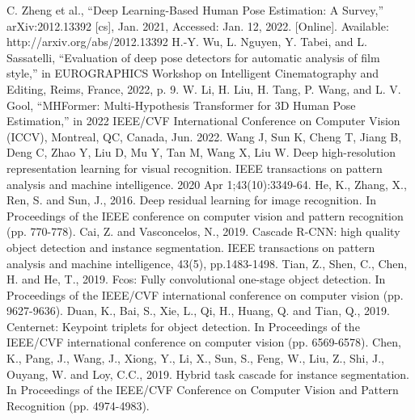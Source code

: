 \documentclass[runningheads]{llncs}
\begin{document}

\begin{thebibliography}{8}
   C. Zheng et al., “Deep Learning-Based Human Pose Estimation: A Survey,” arXiv:2012.13392 [cs], Jan. 2021, Accessed: Jan. 12, 2022. [Online]. Available: http://arxiv.org/abs/2012.13392
   H.-Y. Wu, L. Nguyen, Y. Tabei, and L. Sassatelli, “Evaluation of deep pose detectors for automatic analysis of film style,” in EUROGRAPHICS Workshop on Intelligent Cinematography and Editing, Reims, France, 2022, p. 9.
   W. Li, H. Liu, H. Tang, P. Wang, and L. V. Gool, “MHFormer: Multi-Hypothesis Transformer for 3D Human Pose Estimation,” in 2022 IEEE/CVF International Conference on Computer Vision (ICCV), Montreal, QC, Canada, Jun. 2022.
   Wang J, Sun K, Cheng T, Jiang B, Deng C, Zhao Y, Liu D, Mu Y, Tan M, Wang X, Liu W. Deep high-resolution representation learning for visual recognition. IEEE transactions on pattern analysis and machine intelligence. 2020 Apr 1;43(10):3349-64.
   He, K., Zhang, X., Ren, S. and Sun, J., 2016. Deep residual learning for image recognition. In Proceedings of the IEEE conference on computer vision and pattern recognition (pp. 770-778).
   Cai, Z. and Vasconcelos, N., 2019. Cascade R-CNN: high quality object detection and instance segmentation. IEEE transactions on pattern analysis and machine intelligence, 43(5), pp.1483-1498.
   Tian, Z., Shen, C., Chen, H. and He, T., 2019. Fcos: Fully convolutional one-stage object detection. In Proceedings of the IEEE/CVF international conference on computer vision (pp. 9627-9636).
   Duan, K., Bai, S., Xie, L., Qi, H., Huang, Q. and Tian, Q., 2019. Centernet: Keypoint triplets for object detection. In Proceedings of the IEEE/CVF international conference on computer vision (pp. 6569-6578).
   Chen, K., Pang, J., Wang, J., Xiong, Y., Li, X., Sun, S., Feng, W., Liu, Z., Shi, J., Ouyang, W. and Loy, C.C., 2019. Hybrid task cascade for instance segmentation. In Proceedings of the IEEE/CVF Conference on Computer Vision and Pattern Recognition (pp. 4974-4983).
\end{thebibliography}
\end{document}
